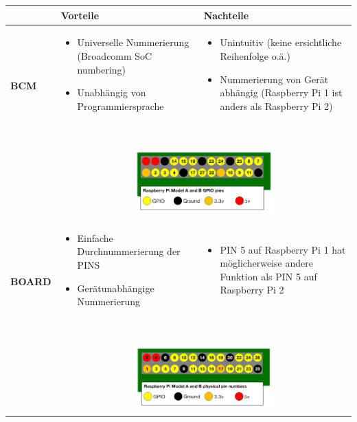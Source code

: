 \documentclass[a4paper,11pt]{article}
\begin{document}
\begin{tabular}{| p{2cm} | p{7cm} | p{7cm} | }
	\hline
	\textbf{} & \textbf{Vorteile} & \textbf{Nachteile} \\\hline
	\textbf{BCM} & 
			\begin{itemize}
				\item Universelle Nummerierung (Broadcomm SoC numbering)
				\item Unabhängig von Programmiersprache
			\end{itemize}~& 
			\begin{itemize}
				\item Unintuitiv (keine ersichtliche Reihenfolge o.ä.)
				\item Nummerierung von Gerät abhängig (Raspberry Pi 1 ist anders als Raspberry Pi 2)
			\end{itemize}~\\
	&
	\multicolumn{2}{|c|}{\includegraphics[width=0.49\textwidth]{images/bcm.png}}~\\\hline
	
	\textbf{BOARD} & 
		\begin{itemize}
			\item Einfache Durchnummerierung der PINS
			\item Gerätunabhängige Nummerierung
		\end{itemize}~& 
		\begin{itemize}
			\item PIN 5 auf Raspberry Pi 1 hat möglicherweise andere Funktion als PIN 5 auf Raspberry Pi 2
		\end{itemize}~
	\\
	&
	\multicolumn{2}{|c|}{\includegraphics[width=0.49\textwidth]{images/board.png}}~\\\hline
	
\end{tabular}
\end{document}
